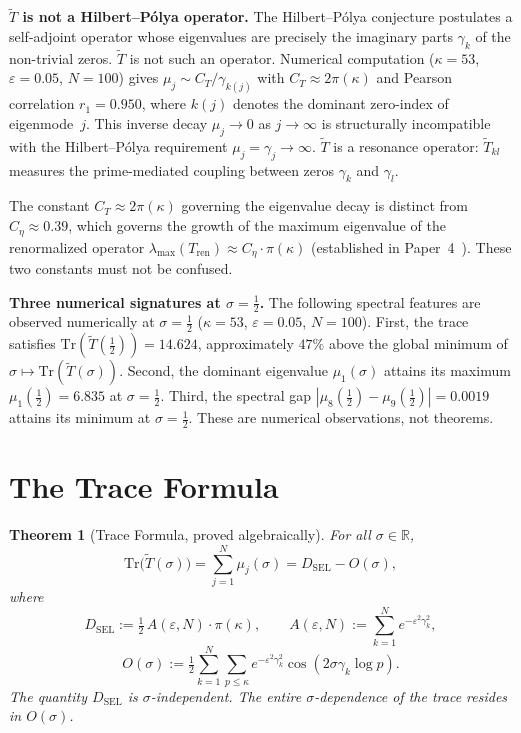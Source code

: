 \documentclass[11pt]{article}
\newtheorem{theorem}{Theorem}[section]
\newcommand{\Tt}{\widetilde{T}}
\newcommand{\DSEL}{D_{\mathrm{SEL}}}
\newcommand{\Ceta}{C_{\eta}}
\newcommand{\CT}{C_{T}}
\begin{document}
\textbf{$\Tt$ is not a Hilbert--P\'olya operator.}
The Hilbert--P\'olya conjecture postulates a self-adjoint operator
whose eigenvalues are precisely the imaginary parts $\gamma_k$ of the
non-trivial zeros.
$\Tt$ is not such an operator.
Numerical computation ($\kappa=53$, $\varepsilon=0.05$, $N=100$) gives
$\mu_j\sim\CT/\gamma_{k(j)}$ with $\CT\approx 2\pi(\kappa)$
and Pearson correlation $r_1=0.950$,
where $k(j)$ denotes the dominant zero-index of eigenmode~$j$.
This inverse decay $\mu_j\to 0$ as $j\to\infty$ is structurally
incompatible with the Hilbert--P\'olya requirement $\mu_j=\gamma_j\to\infty$.
$\Tt$ is a resonance operator: $\Tt_{kl}$ measures the prime-mediated
coupling between zeros $\gamma_k$ and $\gamma_l$.

The constant $\CT\approx 2\pi(\kappa)$ governing the eigenvalue decay
is distinct from $\Ceta\approx 0.39$, which governs the growth of the
maximum eigenvalue of the renormalized operator
$\lambda_{\max}(T_{\mathrm{ren}})\approx\Ceta\cdot\pi(\kappa)$
(established in Paper~4~\cite{Paper4}).
These two constants must not be confused.

\textbf{Three numerical signatures at $\sigma=\tfrac{1}{2}$.}
The following spectral features are observed numerically at
$\sigma=\tfrac{1}{2}$ ($\kappa=53$, $\varepsilon=0.05$, $N=100$).
First, the trace satisfies $\mathrm{Tr}(\Tt(\tfrac{1}{2}))=14.624$,
approximately $47\%$ above the global minimum of
$\sigma\mapsto\mathrm{Tr}(\Tt(\sigma))$.
Second, the dominant eigenvalue $\mu_1(\sigma)$ attains its maximum
$\mu_1(\tfrac{1}{2})=6.835$ at $\sigma=\tfrac{1}{2}$.
Third, the spectral gap $|\mu_8(\tfrac{1}{2})-\mu_9(\tfrac{1}{2})|=0.0019$
attains its minimum at $\sigma=\tfrac{1}{2}$.
These are numerical observations, not theorems.

\section{The Trace Formula}
\label{sec:trace}

\begin{theorem}[Trace Formula, proved algebraically]
\label{thm:trace}
For all $\sigma\in\mathbb{R}$,
\[
\mathrm{Tr}\bigl(\Tt(\sigma)\bigr)
  = \sum_{j=1}^N \mu_j(\sigma)
  = \DSEL - O(\sigma),
\]
where
\[
\DSEL   := \tfrac{1}{2}\,A(\varepsilon,N)\cdot\pi(\kappa),\qquad
A(\varepsilon,N) := \sum_{k=1}^N e^{-\varepsilon^2\gamma_k^2},
\]
\[
O(\sigma) := \tfrac{1}{2}\sum_{k=1}^N\sum_{p\leq\kappa}
             e^{-\varepsilon^2\gamma_k^2}\cos(2\sigma\gamma_k\log p).
\]
The quantity $\DSEL$ is $\sigma$-independent.
The entire $\sigma$-dependence of the trace resides in $O(\sigma)$.
\end{theorem}
\end{document}
